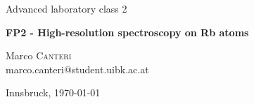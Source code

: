 \documentclass[a4paper,10pt]{article}
\begin{document}
\begin{titlepage}
 \begin{center}
	\Large{Advanced laboratory class 2}
	\end{center}
	\begin{center}
	 \LARGE{\textbf{FP2 - High-resolution spectroscopy on Rb atoms}}
	\end{center}
	
	\begin{center}
	
	\large Marco \textsc{Canteri} \\
	marco.canteri@student.uibk.ac.at
	\end{center}
	
	\begin{center}
	\vspace{1cm}
	Innsbruck, \today
	\vspace{2cm}
	\end{center}
	

\end{titlepage}
\end{document}
